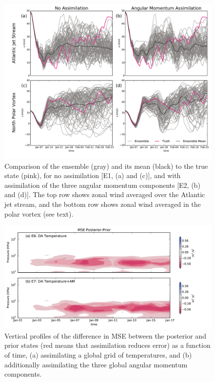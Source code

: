  \begin{figure}
	 \includegraphics[width=\textwidth]{Paper_figures/ERPDA_paper_point_checks.pdf}
	 \caption{Comparison of the ensemble (gray) and its mean (black) to the true state (pink), for no assimilation [E1, (a) and (c)], and with assimilation of the three angular momentum components [E2, (b) and (d)]. The top row shows zonal wind averaged over the Atlantic jet stream, and the bottom row shows zonal wind averaged in the polar vortex (see text).}
	 \label{fig:point_checks}
\end{figure}




 \begin{figure}
	 \includegraphics[width=\textwidth]{Paper_figures/ERPDA_paper_MSEincrement_comparison.pdf}
	 \caption{Vertical profiles of the difference in MSE between the posterior and prior states (red means that assimilation reduces error) as a function of time, (a) assimilating a global grid of temperatures, and (b) additionally assimilating the three global angular momentum components.}
	 \label{fig:added_value_MSEincrement}
\end{figure}


